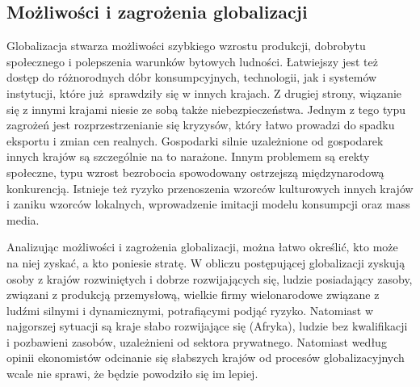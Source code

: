 \documentclass[12pt]{extarticle}
\begin{document}
\subsection{Możliwości i zagrożenia globalizacji}

Globalizacja stwarza możliwości szybkiego wzrostu produkcji, dobrobytu społecznego i polepszenia warunków bytowych ludności. Łatwiejszy jest też dostęp do różnorodnych dóbr konsumpcyjnych, technologii, jak i systemów instytucji, które już sprawdziły się w innych krajach. Z drugiej strony, wiązanie się z innymi krajami niesie ze sobą także niebezpieczeństwa. Jednym z tego typu zagrożeń jest rozprzestrzenianie się kryzysów, który łatwo prowadzi do spadku eksportu i zmian cen realnych. Gospodarki silnie uzależnione od gospodarek innych krajów są szczególnie na to narażone. Innym problemem są erekty społeczne, typu wzrost bezrobocia spowodowany ostrzejszą międzynarodową konkurencją. Istnieje też ryzyko przenoszenia wzorców kulturowych innych krajów i zaniku wzorców lokalnych, wprowadzenie imitacji modelu konsumpcji oraz mass media.

Analizując możliwości i zagrożenia globalizacji, można łatwo określić, kto może na niej zyskać, a kto poniesie stratę. W obliczu postępującej globalizacji zyskują osoby z krajów rozwiniętych i dobrze rozwijających się, ludzie posiadający zasoby, związani z produkcją przemysłową, wielkie firmy wielonarodowe związane z ludźmi silnymi i dynamicznymi, potrafiącymi podjąć ryzyko. Natomiast w najgorszej sytuacji są kraje słabo rozwijające się (Afryka), ludzie bez kwalifikacji i pozbawieni zasobów, uzależnieni od sektora prywatnego. Natomiast według opinii ekonomistów odcinanie się słabszych krajów od procesów globalizacyjnych wcale nie sprawi, że będzie powodziło się im lepiej.
\end{document}
